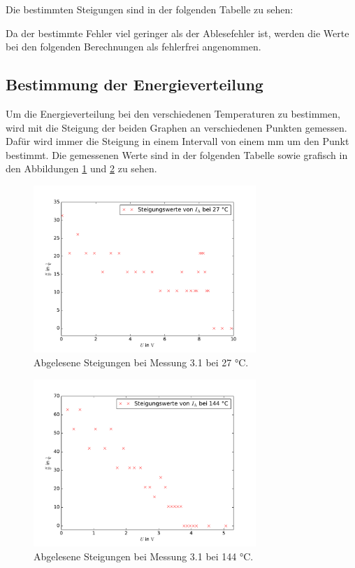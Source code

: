 

Die bestimmten Steigungen sind in der folgenden Tabelle zu sehen:



Da der bestimmte Fehler viel geringer als der Ablesefehler ist, werden die Werte
bei den folgenden Berechnungen als fehlerfrei angenommen.

\subsection{Bestimmung der Energieverteilung}

Um die Energieverteilung bei den verschiedenen Temperaturen zu bestimmen, wird mit
die Steigung der beiden Graphen an verschiedenen Punkten gemessen. Dafür wird immer
die Steigung in einem Intervall von einem mm um den Punkt bestimmt. Die gemessenen
Werte sind in der folgenden Tabelle sowie grafisch in den Abbildungen
\ref{fig:Messung_A_27} und \ref{fig:Messung_A_144} zu sehen.



\begin{figure}
  \centering
  \includegraphics[width = 0.75\textwidth]{Pics/Messung_A_27.pdf}
  \caption{Abgelesene Steigungen bei Messung 3.1 bei 27 °C.}
  \label{fig:Messung_A_27}
\end{figure}

\begin{figure}
  \centering
  \includegraphics[width = 0.75\textwidth]{Pics/Messung_A_144.pdf}
  \caption{Abgelesene Steigungen bei Messung 3.1 bei 144 °C.}
  \label{fig:Messung_A_144}
\end{figure}

